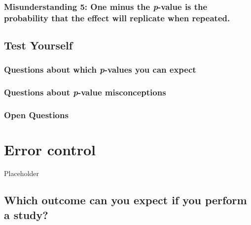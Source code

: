 \documentclass[
  oneside]{krantz}
\begin{document}
\hypertarget{misunderstanding-5-one-minus-the-p-value-is-the-probability-that-the-effect-will-replicate-when-repeated.}{%
\subsubsection{\texorpdfstring{Misunderstanding 5: One minus the
\emph{p}-value is the probability that the effect will replicate when
repeated.}{Misunderstanding 5: One minus the p-value is the probability that the effect will replicate when repeated.}}\label{misunderstanding-5-one-minus-the-p-value-is-the-probability-that-the-effect-will-replicate-when-repeated.}}

\hypertarget{test-yourself}{%
\subsection{Test Yourself}\label{test-yourself}}

\hypertarget{questions-about-which-p-values-you-can-expect}{%
\subsubsection{\texorpdfstring{Questions about which \emph{p}-values you
can
expect}{Questions about which p-values you can expect}}\label{questions-about-which-p-values-you-can-expect}}

\hypertarget{questions-about-p-value-misconceptions}{%
\subsubsection{\texorpdfstring{Questions about \emph{p}-value
misconceptions}{Questions about p-value misconceptions}}\label{questions-about-p-value-misconceptions}}

\hypertarget{open-questions}{%
\subsubsection{Open Questions}\label{open-questions}}

\hypertarget{errorcontrol}{%
\section{Error control}\label{errorcontrol}}

Placeholder

\hypertarget{which-outcome-can-you-expect-if-you-perform-a-study}{%
\subsection{Which outcome can you expect if you perform a
study?}\label{which-outcome-can-you-expect-if-you-perform-a-study}}
\end{document}
